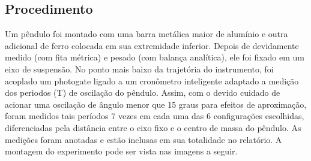 \documentclass[12pt,a4paper]{article}
\begin{document}
\subsection{Procedimento}

Um pêndulo foi montado com uma barra metálica maior de alumínio e outra adicional de ferro colocada em sua extremidade inferior. Depois de devidamente medido (com fita métrica) e pesado (com balança analítica), ele foi fixado em um eixo de suspensão. No ponto mais baixo da trajetória do instrumento, foi acoplado um photogate ligado a um cronômetro inteligente adaptado a medição dos periodos (T) de oscilação do pêndulo. Assim, com o devido cuidado de acionar uma oscilação de ângulo menor que 15 graus para efeitos de aproximação, foram medidos tais períodos 7 vezes em cada uma das 6 configurações escolhidas, diferenciadas pela distância entre o eixo fixo e o centro de massa do pêndulo. As medições foram anotadas e estão inclusas em sua totalidade no relatório. A montagem do experimento pode ser vista nas imagens a seguir.\\
\end{document}
